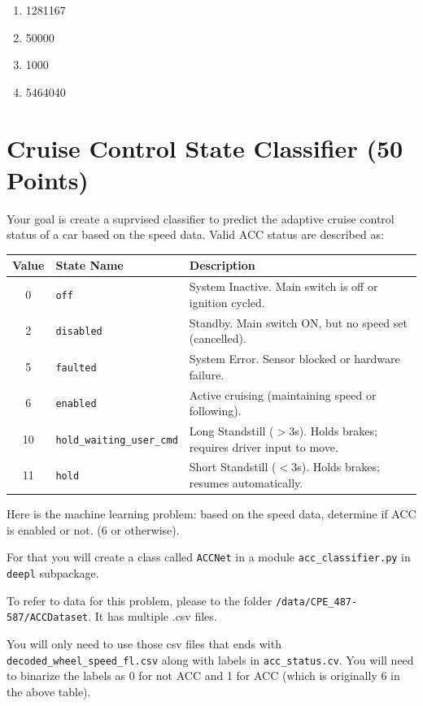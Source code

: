 \documentclass[12pt, xcolor=dvipsnames,svgnames,x11names]{article}
\begin{document}
\begin{enumerate}
\item 1281167
\item 50000
\item 1000
\item 5464040
\end{enumerate}

\section{Cruise Control State Classifier \hfill \textbf{(50 Points)}}
Your goal is create a suprvised classifier to predict the adaptive cruise control status of a car based on the speed data. Valid ACC status are described as:

\begin{tabular}{c l p{7cm}} 
        \toprule
        \textbf{Value} & \textbf{State Name} & \textbf{Description} \\
        \midrule
        0 & \texttt{off} & System Inactive. Main switch is off or ignition cycled. \\
        2 & \texttt{disabled} & Standby. Main switch ON, but no speed set (cancelled). \\
        5 & \texttt{faulted} & System Error. Sensor blocked or hardware failure. \\
        6 & \texttt{enabled} & Active cruising (maintaining speed or following). \\
        10 & \texttt{hold\_waiting\_user\_cmd} & Long Standstill ($>3$s). Holds brakes; requires driver input to move. \\
        11 & \texttt{hold} & Short Standstill ($<3$s). Holds brakes; resumes automatically. \\
        \bottomrule
    \end{tabular}
    
    \vspace{10pt}
    
    

  
Here is the machine learning problem: based on the speed data, determine if ACC is enabled or not. (6 or otherwise).


For that you will create a class called \texttt{ACCNet} in a module \texttt{acc\_classifier.py} in \texttt{deepl} subpackage.


To refer to data for this problem, please to the folder  \texttt{/data/CPE\_487-587/ACCDataset}. It has multiple .csv files. 

You will only need to use those csv files that ends with \texttt{decoded\_wheel\_speed\_fl.csv} along with labels in \texttt{acc\_status.cv}. You will need to binarize the labels as 0 for not ACC and 1 for ACC (which is originally 6 in the above table).
\end{document}
